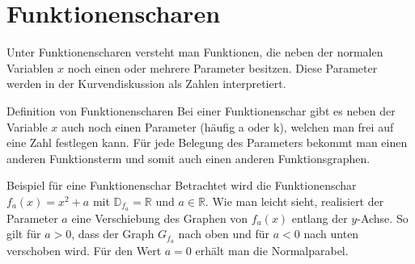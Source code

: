 \section{Funktionenscharen}
Unter Funktionenscharen versteht man Funktionen, die neben der \glqq normalen\grqq{} Variablen $x$ noch einen oder mehrere Parameter besitzen. Diese Parameter werden in der Kurvendiskussion als Zahlen interpretiert. 
\begin{defi}{Definition von Funktionenscharen}{}
Bei einer Funktionenschar gibt es neben der Variable $x$ auch noch einen Parameter (häufig a oder k), welchen man frei auf eine Zahl festlegen kann. Für jede Belegung des Parameters bekommt man einen anderen Funktionsterm und somit auch einen anderen Funktionsgraphen.
\end{defi}
\begin{bsp}{Beispiel für eine Funktionenschar}{}
Betrachtet wird die Funktionenschar $f_a(x) = x^2 +a$ mit $\mathds{D}_{f_a} = \mathds{R}$ und $a \in \mathds{R}$. Wie man leicht sieht, realisiert der Parameter $a$ eine Verschiebung des Graphen von $f_a(x)$ entlang der $y$-Achse. So gilt für $a>0$, dass der Graph $G_{f_a}$ nach oben und für $a<0$ nach unten verschoben wird. Für den Wert $a= 0$ erhält man die Normalparabel.
\begin{center}
\end{center}
\end{bsp}
